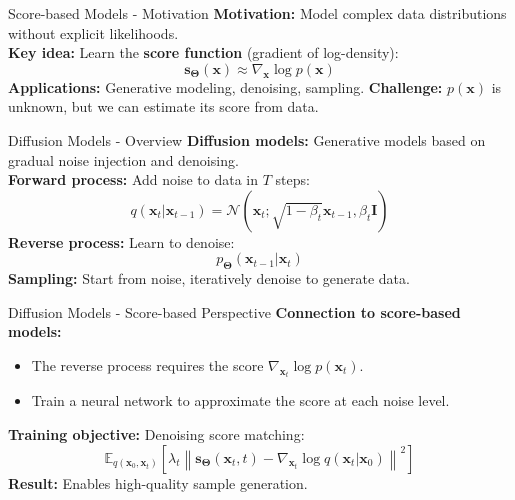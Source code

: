 \documentclass{beamer}
\def\vs1{\vspace{1mm}}
\newcommand{\bs}[1]{\boldsymbol{#1}}
\begin{document}
\begin{frame}{Score-based Models - Motivation}
\textbf{Motivation:} Model complex data distributions without explicit likelihoods.\\
\vs1
\textbf{Key idea:} Learn the \textbf{score function} (gradient of log-density):
\begin{equation}
  \bs{s}_{\bs{\Theta}}(\bs{x}) \approx \nabla_{\bs{x}} \log p(\bs{x})
\end{equation}
\vs1
\textbf{Applications:} Generative modeling, denoising, sampling.
\vs1
\textbf{Challenge:} $p(\bs{x})$ is unknown, but we can estimate its score from data.
\end{frame}

\begin{frame}{Diffusion Models - Overview}
\textbf{Diffusion models:} Generative models based on gradual noise injection and denoising.\\
\vs1
\textbf{Forward process:} Add noise to data in $T$ steps:
\begin{equation}
  q(\bs{x}_t|\bs{x}_{t-1}) = \mathcal{N}(\bs{x}_t; \sqrt{1-\beta_t}\bs{x}_{t-1}, \beta_t \bs{I})
\end{equation}
\vs1
\textbf{Reverse process:} Learn to denoise:
\begin{equation}
  p_{\bs{\Theta}}(\bs{x}_{t-1}|\bs{x}_t)
\end{equation}
\vs1
\textbf{Sampling:} Start from noise, iteratively denoise to generate data.
\end{frame}

\begin{frame}{Diffusion Models - Score-based Perspective}
\textbf{Connection to score-based models:}
\begin{itemize}
  \item The reverse process requires the score $\nabla_{\bs{x}_t} \log p(\bs{x}_t)$.
  \item Train a neural network to approximate the score at each noise level.
\end{itemize}
\vs1
\textbf{Training objective:} Denoising score matching:
\begin{equation}
  \mathbb{E}_{q(\bs{x}_0, \bs{x}_t)} \left[ \lambda_t \left\| \bs{s}_{\bs{\Theta}}(\bs{x}_t, t) - \nabla_{\bs{x}_t} \log q(\bs{x}_t|\bs{x}_0) \right\|^2 \right]
\end{equation}
\vs1
\textbf{Result:} Enables high-quality sample generation.
\end{frame}
\end{document}
